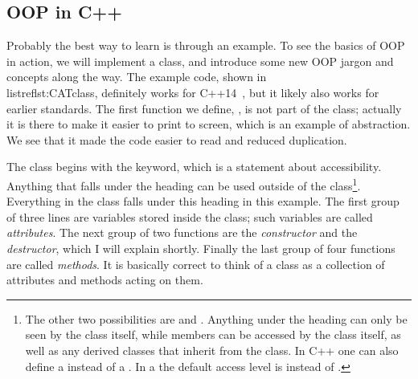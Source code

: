 \subsection{OOP in C++} 
Probably the best way to learn is through an example. To see the basics
of OOP in action, we will implement a  class, and 
introduce some new OOP jargon and concepts along the way.
The example code, shown in \\listref{lst:CATclass}, 
definitely works for C++14~\cite{cppDocumentation},
but it likely also works for earlier standards.
The first function we define, , is not part of the class;
actually it is there to make it easier to print to screen, which is
an example of abstraction. We see that it made the code easier to
read and reduced duplication.

\begin{code*}
\caption{Basic example of a class, the  class, along with
a  auxiliary function. The constructor appears on line 15,
and defines all the actions that should be taken when this object
is created. The destructor is indicated with a \ff{\~} and is defined
on line 22.}
\label{lst:CATclass}
\end{code*}

The  class begins with the  keyword, which
is a statement about accessibility. Anything that falls under the
 heading can be used outside of the class\footnote{The other
two possibilities are  and . 
Anything under the  heading
can only be seen by the class itself, while  members can be accessed 
by the class itself, as well as any derived classes that inherit from the class.
In C++ one can also define a  instead of a .
In a  the default access level is  instead
of .}. 
Everything in the class falls
under this heading in this example. The first group of three lines
are variables stored inside the  class; such variables
are called {\it attributes}. The next group of two functions are
the {\it constructor} and the {\it destructor}, which I will explain
shortly. Finally the last group of four  functions are 
called {\it methods}. It is basically correct to think of a class as a
collection of attributes and methods acting on them.

\begin{code*}
\caption{Main C++ code where the  class is used.}
\label{lst:CATmain}
\end{code*}

